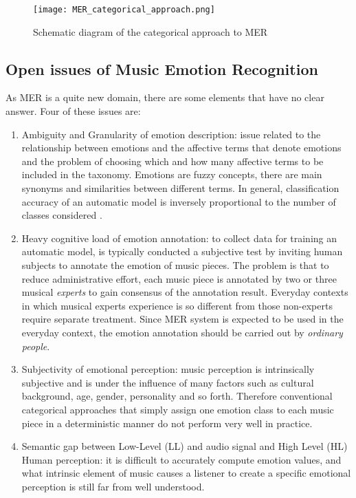 \begin{figure}[h]
    \centering
    \texttt{[image: MER\_categorical\_approach.png]} 
	\caption{Schematic diagram of the categorical approach to MER}
    \label{fig:MER_categorical_approach}
\end{figure}

\subsection{Open issues of Music Emotion Recognition} \label{issues}
As MER is a quite new domain, there are some elements that have no clear answer. Four of these issues are:
\begin{enumerate}
	\item Ambiguity and Granularity of emotion description: issue related to the relationship between emotions and the affective terms that denote emotions and the problem of choosing which and how many affective terms to be included in the taxonomy. Emotions are fuzzy concepts, there are main synonyms and similarities between different terms. In general, classification accuracy of an automatic model is inversely proportional to the number of classes considered \cite{van2006emotion}.
	\item Heavy cognitive load of emotion annotation: to collect data for training an automatic model, is typically conducted a subjective test by inviting human subjects to annotate the emotion of music pieces. The problem is that to reduce administrative effort, each music piece is annotated by two or three musical \textit{experts} to gain consensus of the annotation result. Everyday contexts in which musical experts experience is so different from those non-experts require separate treatment. Since MER system is expected to be used in the everyday context, the emotion annotation should be carried out by \textit{ordinary people}.
	\item Subjectivity of emotional perception: music perception is intrinsically subjective and is under the influence of many factors such as cultural background, age, gender, personality and so forth. Therefore conventional categorical approaches that simply assign one emotion class to each music piece in a deterministic manner do not perform very well in practice.
	\item Semantic gap between Low-Level (LL) and audio signal and High Level (HL) Human perception: it is difficult to accurately compute emotion values, and what intrinsic element of music causes a listener to create a specific emotional perception is still far from well understood.
\end{enumerate}


